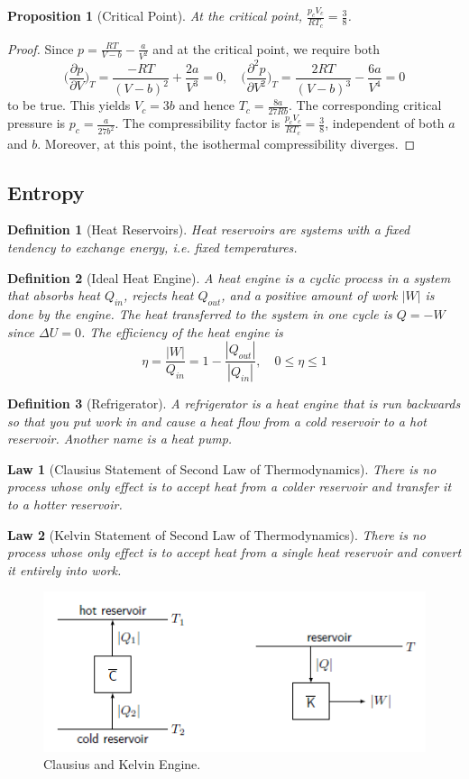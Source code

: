 \documentclass[a4paper]{article}
\newtheorem{defi}{Definition}[section]
\newtheorem{law}{Law}[section]
\newtheorem{prop}{Proposition}[section]
\theoremstyle{new}
\begin{document}
\begin{prop}[Critical Point]
At the critical point, $\frac{p_cV_c}{RT_c}=\frac{3}{8}$.
\end{prop}
\begin{proof}
Since $p=\frac{RT}{V-b}-\frac{a}{V^2}$ and at the critical point, we require both
$$\bigg(\frac{\partial p}{\partial V}\bigg)_T=\frac{-RT}{(V-b)^2}+\frac{2a}{V^3}=0,\quad \bigg(\frac{\partial^2 p}{\partial V^2}\bigg)_T=\frac{2RT}{(V-b)^3}-\frac{6a}{V^4}=0$$
to be true. This yields $V_c=3b$ and hence $T_c=\frac{8a}{27Rb}$. The corresponding critical pressure is $p_c=\frac{a}{27b^2}$. The compressibility factor is $\frac{p_cV_c}{RT_c}=\frac{3}{8}$, independent of both $a$ and $b$. Moreover, at this point, the isothermal compressibility diverges.
\end{proof}
\newpage
\subsection*{Entropy}
\begin{defi}[Heat Reservoirs]
Heat reservoirs are systems with a fixed tendency to exchange energy, i.e. fixed temperatures.
\end{defi}
\begin{defi}[Ideal Heat Engine]
A heat engine is a cyclic process in a system that absorbs heat $Q_{in}$, rejects heat $Q_{out}$, and a positive amount of work $|W|$ is done by the engine. The heat transferred to the system in one cycle is $Q=-W$ since $\Delta U=0$. The efficiency of the heat engine is 
$$\eta=\frac{|W|}{Q_{in}}=1-\frac{|Q_{out}|}{|Q_{in}|},\quad0\leq\eta\leq 1$$
\end{defi}
\begin{defi}[Refrigerator]
A refrigerator is a heat engine that is run backwards so that you put work in and cause a heat flow from a cold reservoir to a hot reservoir. Another name is a heat pump.
\end{defi}
\begin{law}[Clausius Statement of Second Law of Thermodynamics]
There is no process whose only effect is to accept heat from a colder reservoir and transfer it to a hotter reservoir.
\end{law}
\begin{law}[Kelvin Statement of Second Law of Thermodynamics]
There is no process whose only effect is to accept heat from a single heat reservoir and convert it entirely into work.
\end{law}
\begin{figure}[H]
    \centering
    \includegraphics[scale=0.8]{secondlaw1.PNG}
    \caption{Clausius and Kelvin Engine. \cite{blundell2010concepts}}
\end{figure}
\end{document}
